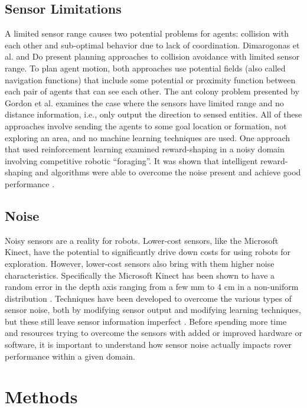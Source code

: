 \documentclass[letterpaper, 10 pt, conference]{ieeeconf}  %
\begin{document}
\subsection{Sensor Limitations}
A limited sensor range causes two potential problems for agents:
collision with each other and sub-optimal behavior due to lack of
coordination. Dimarogonas et al. \cite{dimarogonas2007decentralized} and Do \cite{do2007bounded} present planning approaches to collision avoidance with limited sensor range. To plan agent motion, both approaches use potential fields (also called
navigation functions) that include some potential or proximity function between each pair of agents that can see each other. The ant colony problem presented by Gordon et al. \cite{gordon2004gathering} examines the case where the sensors have limited range and no distance information, i.e., only output the direction to sensed entities. All of these approaches involve sending the agents to some goal location or formation, not exploring an area, and no machine learning techniques are used. One approach that used reinforcement learning examined reward-shaping in a noisy domain involving competitive robotic “foraging”. It was shown that intelligent reward-shaping and algorithms were able to overcome the noise present and achieve good performance \cite{mataric1997reinforcement}.

\subsection{Noise}
Noisy sensors are a reality for robots. Lower-cost sensors, like the Microsoft Kinect, have the potential to significantly drive down costs for using robots for exploration. However, lower-cost sensors also bring with them higher noise characteristics. Specifically the Microsoft Kinect has been shown to have a random error in the depth axis ranging from a few mm to 4 cm in a non-uniform distribution \cite{khoshelham2012accuracy,nguyen2012modeling}. Techniques have been developed to overcome the various types of sensor noise, both by modifying sensor output and modifying learning techniques, but these still leave sensor information imperfect \cite{nguyen2012modeling,hu2010distributed}. Before spending more time and resources trying to overcome the sensors with added or improved hardware or software, it is important to understand how sensor noise actually impacts rover performance within a given domain.


\section{Methods}
\end{document}
